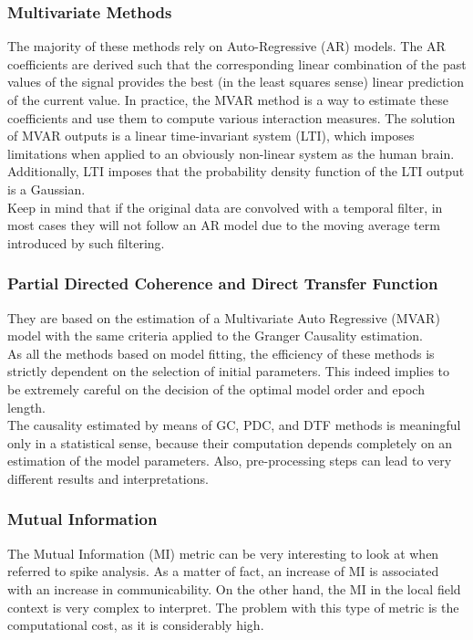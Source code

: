 \subsubsection{Multivariate Methods}
The majority of these methods rely on Auto-Regressive (AR) models. The AR coefficients are derived such that the corresponding linear combination of the past values
of the signal provides the best (in the least squares sense) linear prediction of the current value. In practice, the MVAR method is a way to estimate these coefficients
and use them to compute various interaction measures. The solution of MVAR outputs is a linear time-invariant system (LTI), which imposes limitations when applied to an
obviously non-linear system as the human brain. Additionally, LTI imposes that the probability density function of the LTI output is a Gaussian.\\
Keep in mind that if the original data are convolved with a temporal filter, in most cases they will not follow an AR model due to the moving average term introduced by
such filtering.
\subsubsection{Partial Directed Coherence and Direct Transfer Function}
They are based on the estimation of a Multivariate Auto Regressive (MVAR) model with the same criteria applied to the Granger Causality estimation.\\
As all the methods based on model fitting, the efficiency of these methods is strictly dependent on the selection of initial parameters. This indeed implies to be
extremely careful on the decision of the optimal model order and epoch length.\\
The causality estimated by means of GC, PDC, and DTF methods is meaningful only in a statistical sense, because their computation depends completely on an estimation
of the model parameters. Also, pre-processing steps can lead to very different results and interpretations.
\subsubsection{Mutual Information}
The Mutual Information (MI) metric can be very interesting to look at when referred to spike analysis. As a matter of fact, an increase of MI is associated with an
increase in communicability. On the other hand, the MI in the local field context is very complex to interpret. The problem with this type of metric is the computational
cost, as it is considerably high.
